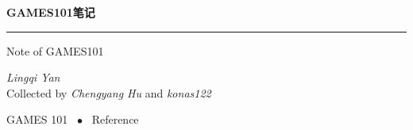 \documentclass[openany]{progbookcn}
\begin{document}
	



\begin{titlepage}
  \vspace*{25ex}

  \hspace{0.05\textwidth}\begin{minipage}{.9\textwidth}
    \flushright

    {\textbf{GAMES101笔记}}

    \rule{\linewidth}{.5pt}

    \vspace{2ex}

    {\textsf{Note of GAMES101}} \\

    \vspace{20ex}

    { \textit{Lingqi Yan} \\Collected by \textit{Chengyang Hu} and \textit{konas122}}
  \end{minipage}

  \vfill

  \centering
  {GAMES 101 ~$\bullet$ ~Reference}
\end{titlepage}
\thispagestyle{empty}


\frontmatter








\clearpage
{
  \hypersetup{hidelinks}
  \tableofcontents
}


\mainmatter












\end{document}

